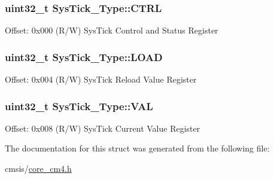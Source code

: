 \subsubsection[{\texorpdfstring{C\+T\+RL}{CTRL}}]{ uint32\+\_\+t Sys\+Tick\+\_\+\+Type\+::\+C\+T\+RL}\hypertarget{struct_sys_tick___type_af2ad94ac83e5d40fc6e34884bc1bec5f}{}\label{struct_sys_tick___type_af2ad94ac83e5d40fc6e34884bc1bec5f}
Offset\+: 0x000 (R/W) Sys\+Tick Control and Status Register 
\subsubsection[{\texorpdfstring{L\+O\+AD}{LOAD}}]{ uint32\+\_\+t Sys\+Tick\+\_\+\+Type\+::\+L\+O\+AD}\hypertarget{struct_sys_tick___type_ae7bc9d3eac1147f3bba8d73a8395644f}{}\label{struct_sys_tick___type_ae7bc9d3eac1147f3bba8d73a8395644f}
Offset\+: 0x004 (R/W) Sys\+Tick Reload Value Register 
\subsubsection[{\texorpdfstring{V\+AL}{VAL}}]{ uint32\+\_\+t Sys\+Tick\+\_\+\+Type\+::\+V\+AL}\hypertarget{struct_sys_tick___type_a0997ff20f11817f8246e8f0edac6f4e4}{}\label{struct_sys_tick___type_a0997ff20f11817f8246e8f0edac6f4e4}
Offset\+: 0x008 (R/W) Sys\+Tick Current Value Register 

The documentation for this struct was generated from the following file\+:\begin{DoxyCompactItemize}
\item 
cmsis/\hyperlink{core__cm4_8h}{core\+\_\+cm4.\+h}\end{DoxyCompactItemize}
